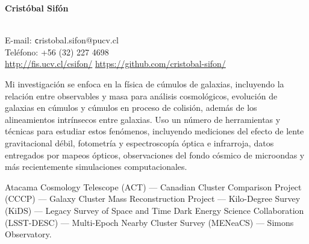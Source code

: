 \documentclass[11pt]{article}
\begin{document}
\begin{minipage}[b]{0.46\linewidth}
\flushleft
\hspace{-0.7cm}
{\bf\huge Crist\'obal Sif\'on}\\\vspace{0.2cm}
\\
\end{minipage}
\begin{minipage}[b]{0.49\linewidth}
\flushright
{\large E-mail: {\texttt cristobal.sifon@pucv.cl}\\
        Teléfono: +56 (32) 227 4698\\
        \url{http://fis.ucv.cl/csifon/}
        \url{https://github.com/cristobal-sifon/}}
\end{minipage}
\vspace{0.4cm}
\hline




Mi investigación se enfoca en la física de cúmulos de galaxias, incluyendo la 
relación entre observables y masa para análisis cosmológicos, evolución de 
galaxias en cúmulos y cúmulos en proceso de colisión, además de los 
alineamientos intrínsecos entre galaxias. Uso un número de herramientas y 
técnicas para estudiar estos fenómenos, incluyendo mediciones del efecto de 
lente gravitacional débil, fotometría y espectroscopía óptica e infrarroja, 
datos entregados por mapeos ópticos, observaciones del fondo cósmico de 
microondas y más recientemente simulaciones computacionales.

\vspace{0.5cm}
{
 Atacama Cosmology Telescope (ACT) ---
 Canadian Cluster Comparison Project (CCCP) ---
 Galaxy Cluster Mass Reconstruction Project ---
 Kilo-Degree Survey (KiDS) ---
 Legacy Survey of Space and Time Dark Energy Science Collaboration (LSST-DESC) ---
 Multi-Epoch Nearby Cluster Survey (MENeaCS) ---
 Simons Observatory.
}
\end{document}
